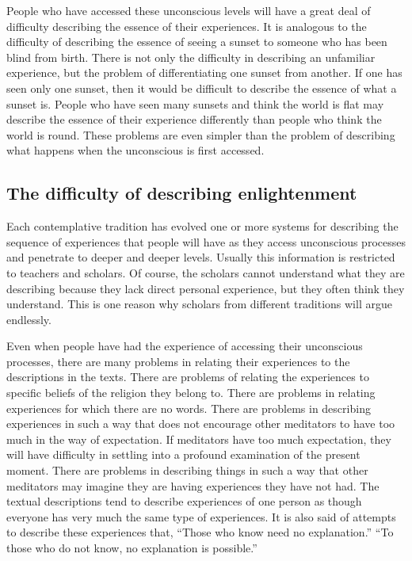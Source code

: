 \documentclass[a5paper,10pt,english]{book}
\begin{document}
\sphinxAtStartPar
People who have accessed these unconscious levels will have a great deal
of difficulty describing the essence of their experiences. It is
analogous to the difficulty of describing the essence of seeing a sunset
to someone who has been blind from birth. There is not only the
difficulty in describing an unfamiliar experience, but the problem of
differentiating one sunset from another. If one has seen only one
sunset, then it would be difficult to describe the essence of what a
sunset is. People who have seen many sunsets and think the world is flat
may describe the essence of their experience differently than people who
think the world is round. These problems are even simpler than the
problem of describing what happens when the unconscious is first
accessed.


\subsection{The difficulty of describing enlightenment}
\label{\detokenize{saints:the-difficulty-of-describing-enlightenment}}
\sphinxAtStartPar
Each contemplative tradition has evolved one or more systems for
describing the sequence of experiences that people will have as they
access unconscious processes and penetrate to deeper and deeper levels.
Usually this information is restricted to teachers and scholars. Of
course, the scholars cannot understand what they are describing because
they lack direct personal experience, but they often think they
understand. This is one reason why scholars from different traditions
will argue endlessly.

\sphinxAtStartPar
Even when people have had the experience of accessing their unconscious
processes, there are many problems in relating their experiences to the
descriptions in the texts. There are problems of relating the
experiences to specific beliefs of the religion they belong to. There
are problems in relating experiences for which there are no words. There
are problems in describing experiences in such a way that does not
encourage other meditators to have too much in the way of expectation.
If meditators have too much expectation, they will have difficulty in
settling into a profound examination of the present moment. There are
problems in describing things in such a way that other meditators may
imagine they are having experiences they have not had. The textual
descriptions tend to describe experiences of one person as though
everyone has very much the same type of experiences. It is also said of
attempts to describe these experiences that, “Those who know need no
explanation.” “To those who do not know, no explanation is possible.”
\end{document}
